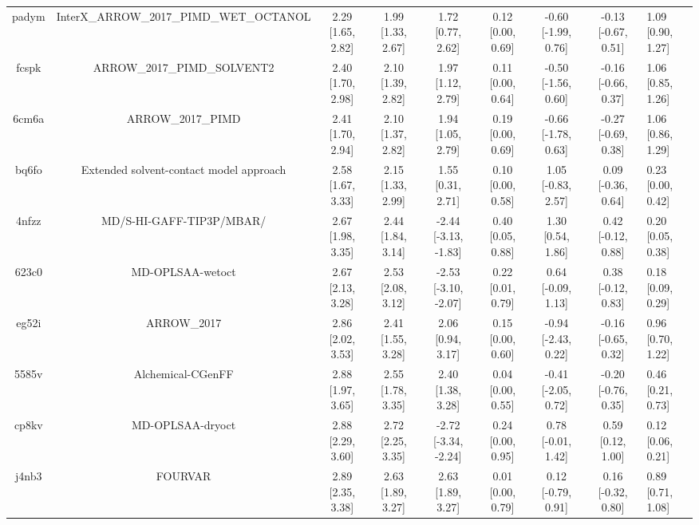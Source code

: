 \documentclass{article}
\begin{document}
\begin{center}
\begin{longtable}{|cccccccc|}
 padym &            InterX\_ARROW\_2017\_PIMD\_WET\_OCTANOL &  2.29 [1.65, 2.82] &  1.99 [1.33, 2.67] &     1.72 [0.77, 2.62] &  0.12 [0.00, 0.69] &  -0.60 [-1.99, 0.76] &  -0.13 [-0.67, 0.51] &     1.09 [0.90, 1.27] \\
 fcspk &                        ARROW\_2017\_PIMD\_SOLVENT2 &  2.40 [1.70, 2.98] &  2.10 [1.39, 2.82] &     1.97 [1.12, 2.79] &  0.11 [0.00, 0.64] &  -0.50 [-1.56, 0.60] &  -0.16 [-0.66, 0.37] &     1.06 [0.85, 1.26] \\
 6cm6a &                                  ARROW\_2017\_PIMD &  2.41 [1.70, 2.94] &  2.10 [1.37, 2.82] &     1.94 [1.05, 2.79] &  0.19 [0.00, 0.69] &  -0.66 [-1.78, 0.63] &  -0.27 [-0.69, 0.38] &     1.06 [0.86, 1.29] \\
 bq6fo &            Extended solvent-contact model approach &  2.58 [1.67, 3.33] &  2.15 [1.33, 2.99] &     1.55 [0.31, 2.71] &  0.10 [0.00, 0.58] &   1.05 [-0.83, 2.57] &   0.09 [-0.36, 0.64] &     0.23 [0.00, 0.42] \\
 4nfzz &                           MD/S-HI-GAFF-TIP3P/MBAR/ &  2.67 [1.98, 3.35] &  2.44 [1.84, 3.14] &  -2.44 [-3.13, -1.83] &  0.40 [0.05, 0.88] &    1.30 [0.54, 1.86] &   0.42 [-0.12, 0.88] &     0.20 [0.05, 0.38] \\
 623c0 &                                   MD-OPLSAA-wetoct &  2.67 [2.13, 3.28] &  2.53 [2.08, 3.12] &  -2.53 [-3.10, -2.07] &  0.22 [0.01, 0.79] &   0.64 [-0.09, 1.13] &   0.38 [-0.12, 0.83] &     0.18 [0.09, 0.29] \\
 eg52i &                                        ARROW\_2017 &  2.86 [2.02, 3.53] &  2.41 [1.55, 3.28] &     2.06 [0.94, 3.17] &  0.15 [0.00, 0.60] &  -0.94 [-2.43, 0.22] &  -0.16 [-0.65, 0.32] &     0.96 [0.70, 1.22] \\
 5585v &                                  Alchemical-CGenFF &  2.88 [1.97, 3.65] &  2.55 [1.78, 3.35] &     2.40 [1.38, 3.28] &  0.04 [0.00, 0.55] &  -0.41 [-2.05, 0.72] &  -0.20 [-0.76, 0.35] &     0.46 [0.21, 0.73] \\
 cp8kv &                                   MD-OPLSAA-dryoct &  2.88 [2.29, 3.60] &  2.72 [2.25, 3.35] &  -2.72 [-3.34, -2.24] &  0.24 [0.00, 0.95] &   0.78 [-0.01, 1.42] &    0.59 [0.12, 1.00] &     0.12 [0.06, 0.21] \\
 j4nb3 &                                            FOURVAR &  2.89 [2.35, 3.38] &  2.63 [1.89, 3.27] &     2.63 [1.89, 3.27] &  0.01 [0.00, 0.79] &   0.12 [-0.79, 0.91] &   0.16 [-0.32, 0.80] &     0.89 [0.71, 1.08] \\

\end{longtable}
\end{center}
\end{document}
